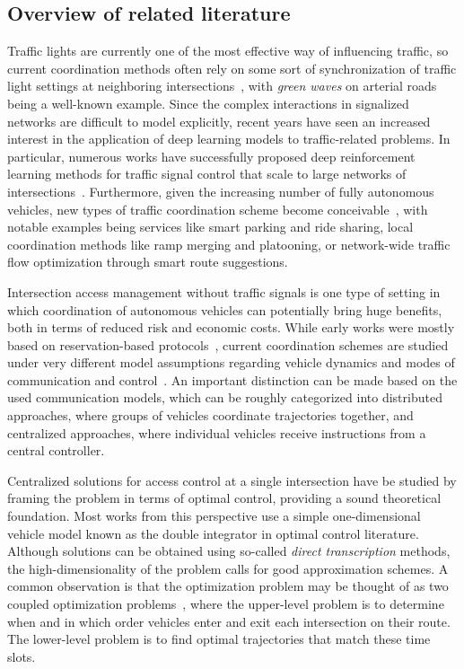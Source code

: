 \documentclass{article}
\theoremstyle{definition}
\theoremstyle{plain}
\begin{document}
\subsection{Overview of related literature}

Traffic lights are currently one of the most effective way of influencing
traffic, so current coordination methods often rely on some sort of
synchronization of traffic light settings at neighboring intersections~\cite{mcshaneTrafficEngineering1990,hePAMSCODPlatoonbasedArterial2012}, with
\textit{green waves} on arterial roads being a well-known example. Since the complex
interactions in signalized networks are difficult to model explicitly, recent
years have seen an increased interest in the application of deep learning models
to traffic-related problems. In particular, numerous works have successfully
proposed deep reinforcement learning methods for traffic signal control that
scale to large networks of intersections~\cite{noaeenReinforcementLearningUrban2022,weiSurveyTrafficSignal2020}.
%
Furthermore, given the increasing number of fully autonomous vehicles, new types of traffic
coordination scheme become
conceivable~\cite{marianiCoordinationAutonomousVehicles2022}, with notable
examples being services like smart parking and ride sharing, local coordination
methods like ramp merging and platooning, or network-wide traffic flow
optimization through smart route suggestions.

Intersection access management without traffic signals is one type of setting in
which coordination of autonomous vehicles can potentially bring huge benefits,
both in terms of reduced risk and economic costs. While early works were mostly
based on reservation-based
protocols~\cite{dresnerMultiagentApproachAutonomous2008}, current coordination
schemes are studied under very different model assumptions regarding vehicle
dynamics and modes of communication and
control~\cite{khayatianSurveyIntersectionManagement2020}. An important
distinction can be made based on the used communication models, which can be
roughly categorized into distributed approaches, where groups of vehicles
coordinate trajectories together, and centralized approaches, where individual
vehicles receive instructions from a central controller.

Centralized solutions for access control at a single intersection have be
studied by framing the problem in terms of optimal control, providing a sound
theoretical foundation. Most works from this perspective use a simple
one-dimensional vehicle model known as the double integrator in optimal control
literature. Although solutions can be obtained using so-called \textit{direct transcription}
methods, the high-dimensionality of the problem calls for good approximation
schemes. A common observation is that the optimization problem may be thought of
as two coupled optimization
problems~\cite{hultApproximateSolutionOptimal2015,zhaoBilevelProgrammingModel2021,tallapragadaHierarchicaldistributedOptimizedCoordination2017},
where the upper-level problem is to determine when and in which order vehicles
enter and exit each intersection on their route. The lower-level problem is to
find optimal trajectories that match these time slots.
\end{document}
